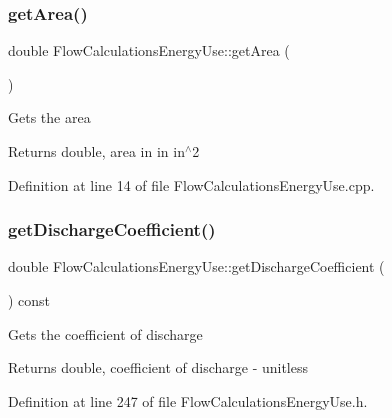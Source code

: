 \subsubsection{\texorpdfstring{get\+Area()}{getArea()}\hspace{0.1cm}{\footnotesize\ttfamily [3/3]}}
{\footnotesize\ttfamily double Flow\+Calculations\+Energy\+Use\+::get\+Area (\begin{DoxyParamCaption}{ }\end{DoxyParamCaption})}

Gets the area

\begin{DoxyReturn}{Returns}
double, area in in in$^\wedge$2 
\end{DoxyReturn}


Definition at line 14 of file Flow\+Calculations\+Energy\+Use.\+cpp.

\mbox{\label{class_flow_calculations_energy_use_a28033765df3a220b5c7d75e34fd95c43}} 
\subsubsection{\texorpdfstring{get\+Discharge\+Coefficient()}{getDischargeCoefficient()}\hspace{0.1cm}{\footnotesize\ttfamily [1/3]}}
{\footnotesize\ttfamily double Flow\+Calculations\+Energy\+Use\+::get\+Discharge\+Coefficient (\begin{DoxyParamCaption}{ }\end{DoxyParamCaption}) const\hspace{0.3cm}{\ttfamily [inline]}}

Gets the coefficient of discharge

\begin{DoxyReturn}{Returns}
double, coefficient of discharge -\/ unitless 
\end{DoxyReturn}


Definition at line 247 of file Flow\+Calculations\+Energy\+Use.\+h.

\mbox{\label{class_flow_calculations_energy_use_a28033765df3a220b5c7d75e34fd95c43}} 
